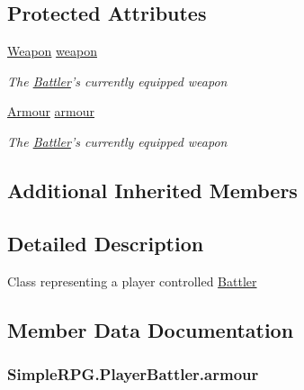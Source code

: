 \subsection*{Protected Attributes}
\begin{DoxyCompactItemize}
\item 
\hyperlink{class_simple_r_p_g_1_1_items_1_1_weapon}{Weapon} \hyperlink{class_simple_r_p_g_1_1_player_battler_af614fea2cfd5439070c57aab600a85cf}{weapon}
\begin{DoxyCompactList}\small\item\em The \hyperlink{class_simple_r_p_g_1_1_battler}{Battler}'s currently equipped weapon \end{DoxyCompactList}\item 
\hyperlink{class_simple_r_p_g_1_1_items_1_1_armour}{Armour} \hyperlink{class_simple_r_p_g_1_1_player_battler_af9cc0e55dd87106ba1d44a42fcf59295}{armour}
\begin{DoxyCompactList}\small\item\em The \hyperlink{class_simple_r_p_g_1_1_battler}{Battler}'s currently equipped weapon \end{DoxyCompactList}\end{DoxyCompactItemize}
\subsection*{Additional Inherited Members}


\subsection{Detailed Description}
Class representing a player controlled \hyperlink{class_simple_r_p_g_1_1_battler}{Battler} 



\subsection{Member Data Documentation}
\hypertarget{class_simple_r_p_g_1_1_player_battler_af9cc0e55dd87106ba1d44a42fcf59295}{
\subsubsection[{armour}]{ Simple\-R\-P\-G.\-Player\-Battler.\-armour\hspace{0.3cm}{\ttfamily [protected]}}}\label{class_simple_r_p_g_1_1_player_battler_af9cc0e55dd87106ba1d44a42fcf59295}


